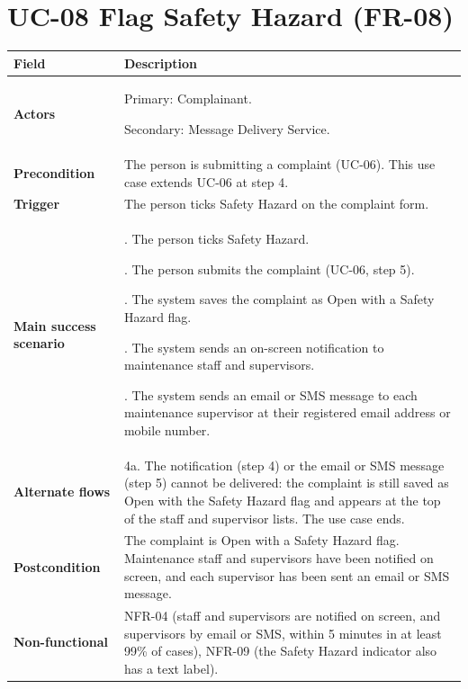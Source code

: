 \documentclass[11pt,a4paper]{report}
\begin{document}
\section{UC-08 Flag Safety Hazard (FR-08)}
\begin{longtable}{|>{\raggedright\arraybackslash}p{3.0cm}|>{\raggedright\arraybackslash}p{12.4cm}|}
\hline \textbf{Field} & \textbf{Description} \\ \hline \endhead
\textbf{Actors} & Primary: Complainant.\par\smallskip Secondary: Message Delivery Service. \\ \hline
\textbf{Precondition} & The person is submitting a complaint (UC-06). This use case extends UC-06 at step 4. \\ \hline
\textbf{Trigger} & The person ticks Safety Hazard on the complaint form. \\ \hline
\textbf{Main success scenario} & 1. The person ticks Safety Hazard.\par\smallskip 2. The person submits the complaint (UC-06, step 5).\par\smallskip 3. The system saves the complaint as Open with a Safety Hazard flag.\par\smallskip 4. The system sends an on-screen notification to maintenance staff and supervisors.\par\smallskip 5. The system sends an email or SMS message to each maintenance supervisor at their registered email address or mobile number. \\ \hline
\textbf{Alternate flows} & 4a. The notification (step 4) or the email or SMS message (step 5) cannot be delivered: the complaint is still saved as Open with the Safety Hazard flag and appears at the top of the staff and supervisor lists. The use case ends. \\ \hline
\textbf{Postcondition} & The complaint is Open with a Safety Hazard flag. Maintenance staff and supervisors have been notified on screen, and each supervisor has been sent an email or SMS message. \\ \hline
\textbf{Non-functional} & NFR-04 (staff and supervisors are notified on screen, and supervisors by email or SMS, within 5 minutes in at least 99\% of cases), NFR-09 (the Safety Hazard indicator also has a text label). \\ \hline
\end{longtable}
\end{document}
